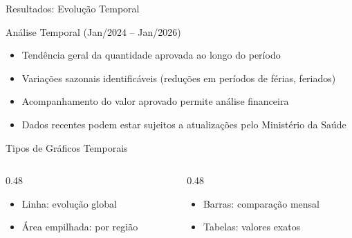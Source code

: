 \documentclass[aspectratio=169,10pt]{beamer}
\begin{document}
\begin{frame}{Resultados: Evolução Temporal}

\begin{block}{Análise Temporal (Jan/2024 -- Jan/2026)}
\begin{itemize}
    \item Tendência geral da quantidade aprovada ao longo do período
    \item Variações sazonais identificáveis (reduções em períodos de férias, feriados)
    \item Acompanhamento do valor aprovado permite análise financeira
    \item Dados recentes podem estar sujeitos a atualizações pelo Ministério da Saúde
\end{itemize}
\end{block}

\vspace{0.3cm}

\begin{exampleblock}{Tipos de Gráficos Temporais}
\begin{columns}[T]
\begin{column}{0.48\textwidth}
    \begin{itemize}
        \item Linha: evolução global
        \item Área empilhada: por região
    \end{itemize}
\end{column}
\begin{column}{0.48\textwidth}
    \begin{itemize}
        \item Barras: comparação mensal
        \item Tabelas: valores exatos
    \end{itemize}
\end{column}
\end{columns}
\end{exampleblock}

\end{frame}
\end{document}
